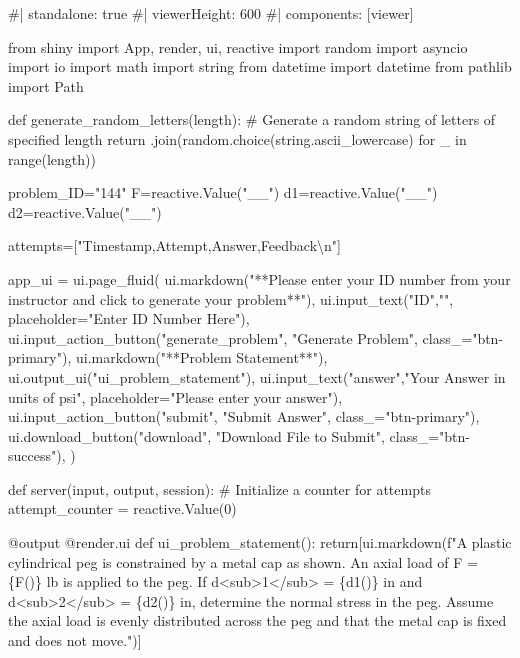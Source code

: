 \documentclass[
  letterpaper,
  DIV=11,
  numbers=noendperiod]{scrreprt}
\newenvironment{Shaded}{\begin{snugshade}}{\end{snugshade}}
\newcommand{\NormalTok}[1]{\textcolor[rgb]{0.00,0.23,0.31}{#1}}
\begin{document}
\begin{Shaded}
\begin{Highlighting}[]
\NormalTok{\#| standalone: true}
\NormalTok{\#| viewerHeight: 600}
\NormalTok{\#| components: [viewer]}

\NormalTok{from shiny import App, render, ui, reactive}
\NormalTok{import random}
\NormalTok{import asyncio}
\NormalTok{import io}
\NormalTok{import math}
\NormalTok{import string}
\NormalTok{from datetime import datetime}
\NormalTok{from pathlib import Path}

\NormalTok{def generate\_random\_letters(length):}
\NormalTok{    \# Generate a random string of letters of specified length}
\NormalTok{    return \textquotesingle{}\textquotesingle{}.join(random.choice(string.ascii\_lowercase) for \_ in range(length))}

\NormalTok{problem\_ID="144"}
\NormalTok{F=reactive.Value("\_\_")}
\NormalTok{d1=reactive.Value("\_\_")}
\NormalTok{d2=reactive.Value("\_\_")}

\NormalTok{attempts=["Timestamp,Attempt,Answer,Feedback\textbackslash{}n"]}

\NormalTok{app\_ui = ui.page\_fluid(}
\NormalTok{    ui.markdown("**Please enter your ID number from your instructor and click to generate your problem**"),}
\NormalTok{    ui.input\_text("ID","", placeholder="Enter ID Number Here"),}
\NormalTok{    ui.input\_action\_button("generate\_problem", "Generate Problem", class\_="btn{-}primary"),}
\NormalTok{    ui.markdown("**Problem Statement**"),}
\NormalTok{    ui.output\_ui("ui\_problem\_statement"),}
\NormalTok{    ui.input\_text("answer","Your Answer in units of psi", placeholder="Please enter your answer"),}
\NormalTok{    ui.input\_action\_button("submit", "Submit Answer", class\_="btn{-}primary"),}
\NormalTok{    ui.download\_button("download", "Download File to Submit", class\_="btn{-}success"),}
\NormalTok{)}


\NormalTok{def server(input, output, session):}
\NormalTok{    \# Initialize a counter for attempts}
\NormalTok{    attempt\_counter = reactive.Value(0)}

\NormalTok{    @output}
\NormalTok{    @render.ui}
\NormalTok{    def ui\_problem\_statement():}
\NormalTok{        return[ui.markdown(f"A plastic cylindrical peg is constrained by a metal cap as shown. An axial load of F = \{F()\} lb is applied to the peg. If d\textless{}sub\textgreater{}1\textless{}/sub\textgreater{} = \{d1()\} in and d\textless{}sub\textgreater{}2\textless{}/sub\textgreater{} = \{d2()\} in, determine the normal stress in the peg. Assume the axial load is evenly distributed across the peg and that the metal cap is fixed and does not move.")]}
    

\end{Highlighting}
\end{Shaded}
\end{document}
